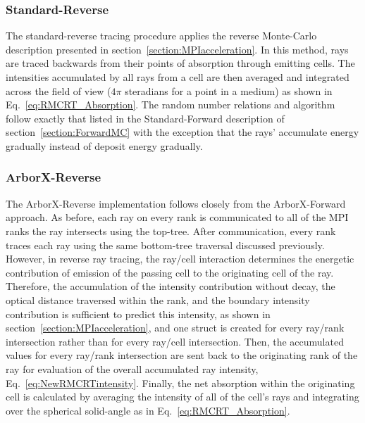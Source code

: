 
\subsubsection{Standard-Reverse}
The standard-reverse tracing procedure applies the reverse Monte-Carlo description presented in section~\ref{section:MPIacceleration}. In this method, rays are traced backwards from their points of absorption through emitting cells. The intensities accumulated by all rays from a cell are then averaged and integrated across the field of view ($4\pi$ steradians for a point in a medium) as shown in Eq.~\ref{eq:RMCRT_Absorption}. The random number relations and algorithm follow exactly that listed in the Standard-Forward description of section~\ref{section:ForwardMC} with the exception that the rays' accumulate energy gradually instead of deposit energy gradually.

\subsubsection{ArborX-Reverse}
The ArborX-Reverse implementation follows closely from the ArborX-Forward approach. As before, each ray on every rank is communicated to all of the MPI ranks the ray intersects using the top-tree. After communication, every rank traces each ray using the same bottom-tree traversal discussed previously.
However, in reverse ray tracing, the ray/cell interaction determines the energetic contribution of emission of the passing cell to the originating cell of the ray. Therefore, the accumulation of the intensity contribution without decay, the optical distance traversed within the rank, and the boundary intensity contribution is sufficient to predict this intensity, as shown in section~\ref{section:MPIacceleration}, and one struct is created for every ray/rank intersection rather than for every ray/cell intersection. Then, the accumulated values for every ray/rank intersection are sent back to the originating rank of the ray for evaluation of the overall accumulated ray intensity, Eq.~\ref{eq:NewRMCRTintensity}.
Finally, the net absorption within the originating cell is calculated by averaging the intensity of all of the cell's rays and integrating over the spherical solid-angle as in Eq.~\ref{eq:RMCRT_Absorption}.

